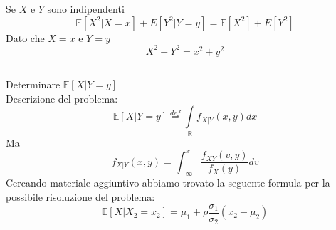 \documentclass[a4paper]{article}
\newcommand{\E}[0]{\mathbb{E}}
\begin{document}
Se $X$ e $Y$ sono indipendenti
$$
\E[X^2|X=x] + E[Y^2|Y=y] =
\E[X^2] + E[Y^2]
$$
Dato che $X=x$ e $Y=y$
$$
X^2 + Y^2 = x^2 + y^2
$$
\subsection{}
Determinare $\E[X|Y=y]$ \\
Descrizione del problema:
$$
\E[X|Y=y]\stackrel{def}{=}\underset{\mathbb{R}}{\int}f_{X|Y}(x,y)dx
$$
Ma
$$
f_{X|Y}(x,y) = \int_{-\infty}^{x}\frac{f_{XY}(v,y)}{f_X(y)}dv
$$
Cercando materiale aggiuntivo abbiamo trovato la seguente formula per la possibile risoluzione del problema:
$$
\E[X|X_2=x_2] = \mu_{1}+\rho\frac{\sigma_1}{\sigma_2}(x_2-\mu_2)
$$
\end{document}
